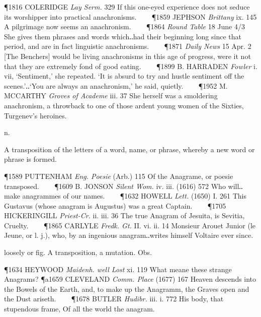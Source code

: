 \begin{description}[wide, labelwidth=!, labelindent=0pt]
\begin{myenumerate}
\P 1816 COLERIDGE \textit{Lay Serm.} 329 If this one-eyed experience does not seduce its worshipper into practical anachronisms.    
\P 1859 JEPHSON \textit{Brittany} ix. 145 A pilgrimage now seems an anachronism.    
\P 1864 \textit{Round Table} 18 June 4/3 She gives them phrases and words which‥had their beginning long since that period, and are in fact linguistic anachronisms.    
\P 1871 \textit{Daily News} 15 Apr. 2 [The Benchers] would be living anachronisms in this age of progress, were it not that they are extremely fond of good eating.    
\P 1899 B. HARRADEN \textit{Fowler} i. vii, ‘Sentiment,’ she repeated. ‘It is absurd to try and hustle sentiment off the scenes.’‥‘You are always an anachronism,’ he said, quietly.    
\P 1952 M. MCCARTHY \textit{Groves of Academe} iii. 37 She herself was a smoldering anachronism, a throwback to one of those ardent young women of the Sixties, Turgenev's heroines.
\end{myenumerate}

  n.

\noindent  {}

\vspace{-0.3cm}

\begin{myenumerate}
 A transposition of the letters of a word, name, or phrase, whereby a new word or phrase is formed. 

\P 1589 PUTTENHAM \textit{Eng. Poesie} (Arb.) 115 Of the Anagrame, or poesie transposed.    
\P 1609 B. JONSON \textit{Silent Wom.} iv. iii. (1616) 572 Who will‥make anagrammes of our names.    
\P 1632 HOWELL \textit{Lett.} (1650) I. 261 This Gustavus (whose anagram is Augustus) was a great Captain.    
\P 1705 HICKERINGILL \textit{Priest-Cr.} ii. iii. 36 The true Anagram of Jesuita, is Sevitia, Cruelty.    
\P 1865 CARLYLE \textit{Fredk. Gt.} II. vi. ii. 14 Monsieur Arouet Junior (le Jeune, or l. j.), who, by an ingenious anagram‥writes himself Voltaire ever since.

 loosely or fig. A transposition, a mutation. Obs. 

\P 1634 HEYWOOD \textit{Maidenh. well Lost} xi. 119 What meane these strange Anagrams?
\P a1659 CLEVELAND \textit{Comm. Place} (1677) 167 Heaven descends into the Bowels of the Earth, and, to make up the Anagramm, the Graves open and the Dust ariseth.    
\P 1678 BUTLER \textit{Hudibr.} iii. i. 772 His body, that stupendous frame, Of all the world the anagram.
\end{myenumerate}


\end{description}
